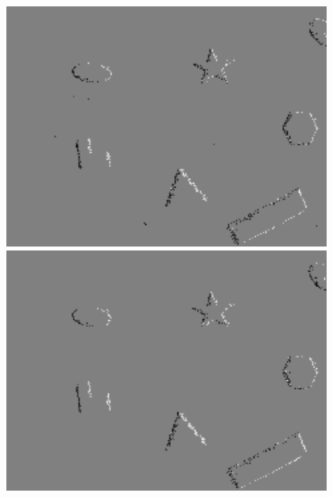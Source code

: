 



\begin{figure}
    \centering
    \begin{minipage}{0.33\textwidth}
        \centering
        \includegraphics[width = 0.95\textwidth]{images/unfiltered_shapes1.png}
    \end{minipage}\hfill
    \begin{minipage}{0.33\textwidth}
        \centering
        \includegraphics[width = 0.95\textwidth]{images/filtered_shapes1.png}

\end{minipage}
\end{figure}

